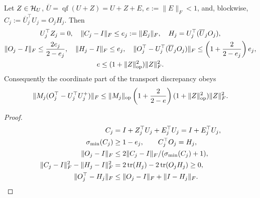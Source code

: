 \begin{proposition}
\label{prop:rigid-small-transport}
Let $Z\in\mathcal H_U$, $\overline U=\operatorname{qf}(U+Z)=U+Z+E$,
$e:=\|E\|_F<1$, and, blockwise, $C_j:=\overline U_j^\top U_j=O_jH_j$.
Then
\begin{gather}
 U_j^\top Z_j=0,\quad \|C_j-I\|_F\le e_j:=\|E_j\|_F,\quad
 H_j=U_j^\top(\overline U_jO_j),\\
 \|O_j-I\|_F\le\frac{2e_j}{2-e_j},\quad
 \|H_j-I\|_F\le e_j,\quad
 \|O_j^\top-U_j^\top(\overline U_jO_j)\|_F
                 \le\left(1+\frac2{2-e_j}\right)e_j,\\
 e\le(1+\|Z\|_{\mathrm{op}}^2)\|Z\|_F^2.
\end{gather}
Consequently the coordinate part of the transport discrepancy obeys
\begin{equation}
 \|M_j(O_j^\top-U_j^\top U_j^+)\|_F
 \le\|M_j\|_{\mathrm{op}}\left(1+\frac2{2-e}\right)
                    (1+\|Z\|_{\mathrm{op}}^2)\|Z\|_F^2.
\end{equation}
\end{proposition}
\begin{proof}
\begin{align}
 C_j&=I+Z_j^\top U_j+E_j^\top U_j=I+E_j^\top U_j,\\
 \sigma_{\min}(C_j)&\ge1-e_j,\qquad C_j^\top O_j=H_j,\\
 \|O_j-I\|_F&\le2\|C_j-I\|_F/(\sigma_{\min}(C_j)+1),\\
 \|C_j-I\|_F^2-\|H_j-I\|_F^2
 &=2\operatorname{tr}(H_j)-2\operatorname{tr}(O_jH_j)\ge0,\\
 \|O_j^\top-H_j\|_F&\le\|O_j-I\|_F+\|I-H_j\|_F.
\end{align}
\end{proof}
